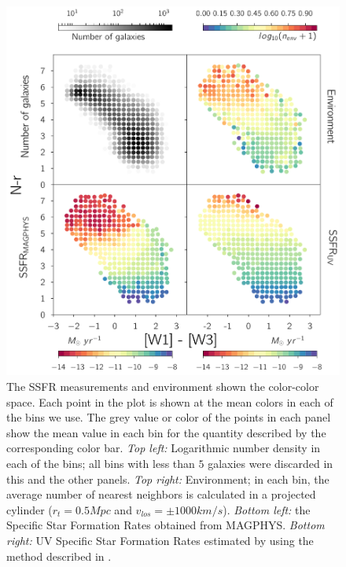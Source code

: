 \begin{figure}
\includegraphics[width=\textwidth]{figures/1_panel_plot.pdf}
\caption[The SSFR measurements and environment 
    shown the color-color 
    space. Each point in the plot is shown at the mean colors in each of 
    the bins we use. The grey value or color of the points in each
    panel show the mean value in each bin for the quantity described 
    by the corresponding  color bar.]
    {The SSFR measurements and environment 
    shown the color-color 
    space. Each point in the plot is shown at the mean colors in each of 
    the bins we use. The grey value or color of the points in each
    panel show the mean value in each bin for the quantity described 
    by the corresponding  color bar.
    \emph{Top left:} Logarithmic number density in each of the 
    bins; all bins with less than $5$ galaxies were discarded in this 
    and the other panels. \emph{Top right:} Environment; in each bin, 
    the average number of nearest neighbors is calculated in a 
    projected cylinder ($r_{t} = 0.5 Mpc$ and $v_{los} = \pm 1000 km/s$). 
    \emph{Bottom left:} the Specific Star Formation Rates obtained from 
    MAGPHYS. \emph{Bottom right:} UV Specific Star Formation Rates 
    estimated by using the method described in \citet{salim_uv_2007}.
\label{fig:panel_plot}}
\end{figure}

